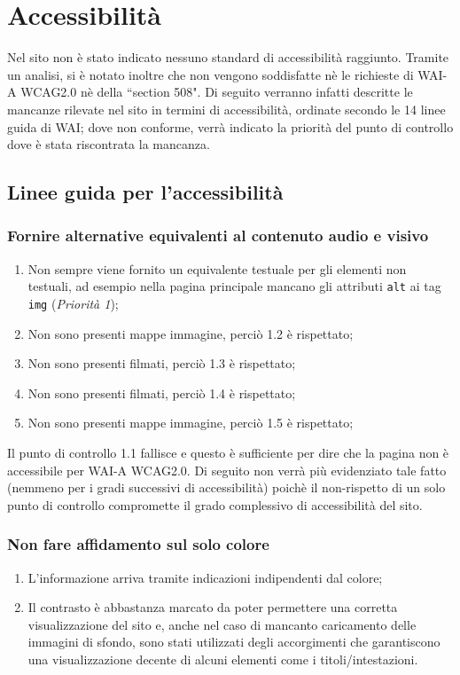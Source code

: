 \section{Accessibilità}\label{sec:accessibilita}
Nel sito non è stato indicato nessuno standard di accessibilità raggiunto.
Tramite un analisi, si è notato inoltre che non vengono soddisfatte nè le
richieste di WAI-A WCAG2.0 nè della ``section 508".
Di seguito verranno infatti descritte le mancanze rilevate nel sito in termini
di accessibilità, ordinate secondo le 14 linee guida di WAI; dove non conforme,
verrà indicato la priorità del punto di controllo dove è stata riscontrata la
mancanza.

\subsection{Linee guida per l'accessibilità}

\subsubsection{Fornire alternative equivalenti al contenuto audio e visivo}
\begin{enumerate}
\item Non sempre viene fornito un equivalente testuale per gli elementi non
testuali, ad esempio nella pagina principale mancano gli attributi \texttt{alt}
ai tag \texttt{img}
(\textit{Priorità 1});
\item Non sono presenti mappe immagine, perciò 1.2 è rispettato;
\item Non sono presenti filmati, perciò 1.3 è rispettato;
\item Non sono presenti filmati, perciò 1.4 è rispettato;
\item Non sono presenti mappe immagine, perciò 1.5 è rispettato;
\end{enumerate}

Il punto di controllo 1.1 fallisce e questo è sufficiente per dire che la
pagina non è accessibile per WAI-A WCAG2.0. Di seguito non verrà più
evidenziato tale fatto (nemmeno per i gradi successivi di accessibilità) poichè
il non-rispetto di un solo punto di controllo compromette il grado complessivo
di accessibilità del sito.

\subsubsection{Non fare affidamento sul solo colore}
\begin{enumerate}
\item L'informazione arriva tramite indicazioni indipendenti dal colore;
\item Il contrasto è abbastanza marcato da poter permettere una corretta visualizzazione del sito e, anche nel caso di mancanto caricamento delle immagini di sfondo, sono stati utilizzati degli accorgimenti che garantiscono una visualizzazione decente di alcuni elementi come i titoli/intestazioni.
\end{enumerate}

